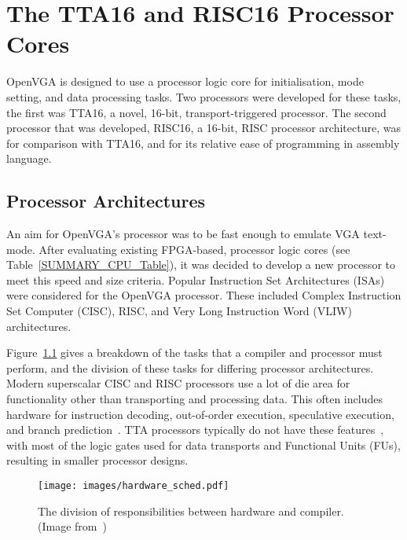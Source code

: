 \chapter{The TTA16 and RISC16 Processor Cores}
\label{CPU}

OpenVGA is designed to use a processor logic core for initialisation, mode
setting, and data processing tasks. Two processors were developed for these
tasks, the first was TTA16, a novel, 16-bit, transport-triggered processor. The
second processor that was developed, RISC16, a 16-bit, RISC processor
architecture, was for comparison with TTA16, and for its relative ease of
programming in assembly language.


\section{Processor Architectures}
An aim for OpenVGA's processor was to be fast enough to emulate VGA text-mode.
After evaluating existing FPGA-based, processor logic cores (see
Table~\ref{SUMMARY_CPU_Table}), it was decided to develop a new processor to meet
this speed and size criteria. Popular Instruction Set
Architectures
(ISAs) were considered for the OpenVGA processor. These included Complex
Instruction Set Computer (CISC), RISC, and Very Long Instruction Word (VLIW) architectures.

Figure~\ref{CPU_Sched} gives a breakdown of the tasks that a compiler and
processor must perform, and the division of these tasks for differing processor
architectures. Modern superscalar CISC and RISC processors use a lot of die area
for functionality other than transporting and processing data. This often
includes hardware for instruction decoding, out-of-order execution, speculative
execution, and branch prediction~\cite{parhami2005cam}. TTA processors typically
do not have these features~\cite{corporaal:tta}, with most of the logic gates
used for data transports and Functional Units (FUs), resulting in smaller processor designs.

\begin{figure}[h!]
\begin{center}
\texttt{[image: images/hardware\_sched.pdf]}
\caption[The division of responsibilities between hardware and compiler]{The
division of responsibilities between hardware and compiler. (Image
from~\cite{corporaal1999tmi})}
\label{CPU_Sched}
\end{center}
\end{figure}

